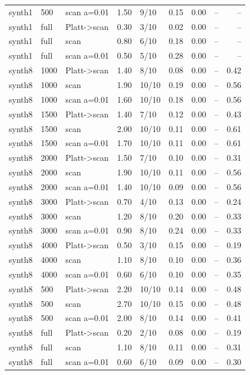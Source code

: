 \begin{tabular}{lllrlrrrr}
synth1 & 500 & scan a=0.01 & 1.50 & 9/10 & 0.15 & 0.00 & -- & -- \\
synth1 & full & Platt->scan & 0.30 & 3/10 & 0.02 & 0.00 & -- & -- \\
synth1 & full & scan & 0.80 & 6/10 & 0.18 & 0.00 & -- & -- \\
synth1 & full & scan a=0.01 & 0.50 & 5/10 & 0.28 & 0.00 & -- & -- \\
synth8 & 1000 & Platt->scan & 1.40 & 8/10 & 0.08 & 0.00 & -- & 0.42 \\
synth8 & 1000 & scan & 1.90 & 10/10 & 0.19 & 0.00 & -- & 0.56 \\
synth8 & 1000 & scan a=0.01 & 1.60 & 10/10 & 0.18 & 0.00 & -- & 0.56 \\
synth8 & 1500 & Platt->scan & 1.40 & 7/10 & 0.12 & 0.00 & -- & 0.43 \\
synth8 & 1500 & scan & 2.00 & 10/10 & 0.11 & 0.00 & -- & 0.61 \\
synth8 & 1500 & scan a=0.01 & 1.70 & 10/10 & 0.11 & 0.00 & -- & 0.61 \\
synth8 & 2000 & Platt->scan & 1.50 & 7/10 & 0.10 & 0.00 & -- & 0.31 \\
synth8 & 2000 & scan & 1.90 & 10/10 & 0.11 & 0.00 & -- & 0.56 \\
synth8 & 2000 & scan a=0.01 & 1.40 & 10/10 & 0.09 & 0.00 & -- & 0.56 \\
synth8 & 3000 & Platt->scan & 0.70 & 4/10 & 0.13 & 0.00 & -- & 0.24 \\
synth8 & 3000 & scan & 1.20 & 8/10 & 0.20 & 0.00 & -- & 0.33 \\
synth8 & 3000 & scan a=0.01 & 0.90 & 8/10 & 0.24 & 0.00 & -- & 0.33 \\
synth8 & 4000 & Platt->scan & 0.50 & 3/10 & 0.15 & 0.00 & -- & 0.19 \\
synth8 & 4000 & scan & 1.10 & 8/10 & 0.10 & 0.00 & -- & 0.36 \\
synth8 & 4000 & scan a=0.01 & 0.60 & 6/10 & 0.10 & 0.00 & -- & 0.35 \\
synth8 & 500 & Platt->scan & 2.20 & 10/10 & 0.14 & 0.00 & -- & 0.48 \\
synth8 & 500 & scan & 2.70 & 10/10 & 0.15 & 0.00 & -- & 0.48 \\
synth8 & 500 & scan a=0.01 & 2.00 & 8/10 & 0.14 & 0.00 & -- & 0.41 \\
synth8 & full & Platt->scan & 0.20 & 2/10 & 0.08 & 0.00 & -- & 0.19 \\
synth8 & full & scan & 1.10 & 8/10 & 0.11 & 0.00 & -- & 0.31 \\
synth8 & full & scan a=0.01 & 0.60 & 6/10 & 0.09 & 0.00 & -- & 0.30 \\
\bottomrule
\end{tabular}
